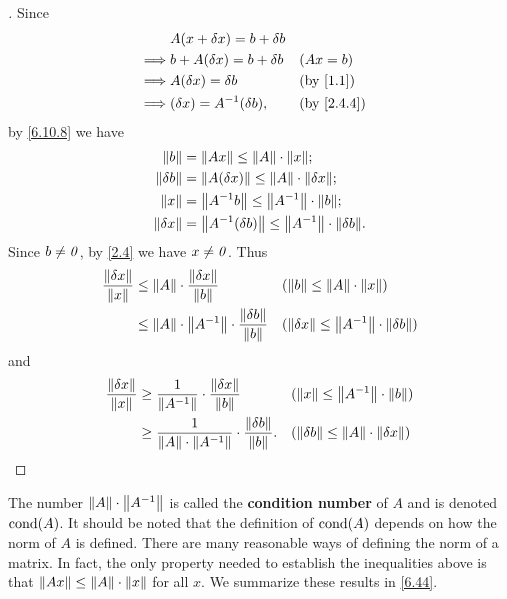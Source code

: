 \begin{proof}[]
  Since
  \begin{align*}
             & A (x + \delta x) = b + \delta b                 \\
    \implies & b + A (\delta x) = b + \delta b &  & (Ax = b)   \\
    \implies & A (\delta x) = \delta b         &  & \by{1.1}   \\
    \implies & (\delta x) = A^{-1} (\delta b), &  & \by{2.4.4}
  \end{align*}
  by \cref{6.10.8} we have
  \begin{align*}
    \norm{b}        & = \norm{Ax} \leq \norm{A} \cdot \norm{x};                            \\
    \norm{\delta b} & = \norm{A (\delta x)} \leq \norm{A} \cdot \norm{\delta x};           \\
    \norm{x}        & = \norm{A^{-1} b} \leq \norm{A^{-1}} \cdot \norm{b};                 \\
    \norm{\delta x} & = \norm{A^{-1} (\delta b)} \leq \norm{A^{-1}} \cdot \norm{\delta b}.
  \end{align*}
  Since \(b \neq \mathit{0}\), by \cref{2.4} we have \(x \neq \mathit{0}\).
  Thus
  \begin{align*}
    \dfrac{\left\lVert\delta x\right\rVert}{\left\lVert x\right\rVert} & \leq \left\lVert A\right\rVert \cdot \dfrac{\left\lVert\delta x\right\rVert}{\left\lVert b\right\rVert}                     &  & (\left\lVert b\right\rVert \leq \left\lVert A\right\rVert \cdot \left\lVert x\right\rVert)                    \\
                                      & \leq \left\lVert A\right\rVert \cdot \left\lVert A^{-1}\right\rVert \cdot \dfrac{\left\lVert\delta b\right\rVert}{\left\lVert b\right\rVert} &  & (\left\lVert\delta x\right\rVert \leq \left\lVert A^{-1}\right\rVert \cdot \left\lVert\delta b\right\rVert)
  \end{align*}
  and
  \begin{align*}
    \dfrac{\left\lVert\delta x\right\rVert}{\left\lVert x\right\rVert} & \geq \dfrac{1}{\left\lVert A^{-1}\right\rVert} \cdot \dfrac{\left\lVert\delta x\right\rVert}{\left\lVert b\right\rVert}                 &  & (\left\lVert x\right\rVert \leq \left\lVert A^{-1}\right\rVert \cdot \left\lVert b\right\rVert)          \\
                                      & \geq \dfrac{1}{\left\lVert A\right\rVert \cdot \left\lVert A^{-1}\right\rVert} \cdot \dfrac{\left\lVert\delta b\right\rVert}{\left\lVert b\right\rVert}. &  & (\left\lVert\delta b\right\rVert \leq \left\lVert A\right\rVert \cdot \left\lVert\delta x\right\rVert)
  \end{align*}
\end{proof}

\begin{defn}\label{6.10.10}
  The number \(\left\lVert A\right\rVert \cdot \left\lVert A^{-1}\right\rVert\) is called the \textbf{condition number} of \(A\) and is denoted \(\cond{A}\).
  It should be noted that the definition of \(\cond{A}\) depends on how the norm of \(A\) is defined.
  There are many reasonable ways of defining the norm of a matrix.
  In fact, the only property needed to establish the inequalities above is that \(\left\lVert Ax\right\rVert \leq \left\lVert A\right\rVert \cdot \left\lVert x\right\rVert\) for all \(x\).
  We summarize these results in \cref{6.44}.
\end{defn}

